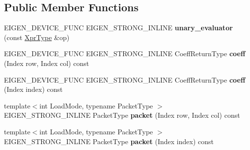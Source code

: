 \subsection*{Public Member Functions}
\begin{DoxyCompactItemize}
\item 
\mbox{\label{struct_eigen_1_1internal_1_1unary__evaluator_3_01_cwise_unary_op_3_01_unary_op_00_01_arg_type_01_4_00_01_index_based_01_4_a742283a9afba17ade87dd3dda0332bab}} 
E\+I\+G\+E\+N\+\_\+\+D\+E\+V\+I\+C\+E\+\_\+\+F\+U\+NC E\+I\+G\+E\+N\+\_\+\+S\+T\+R\+O\+N\+G\+\_\+\+I\+N\+L\+I\+NE {\bfseries unary\+\_\+evaluator} (const \mbox{\hyperlink{class_eigen_1_1_cwise_unary_op}{Xpr\+Type}} \&op)
\item 
\mbox{\label{struct_eigen_1_1internal_1_1unary__evaluator_3_01_cwise_unary_op_3_01_unary_op_00_01_arg_type_01_4_00_01_index_based_01_4_ae84ff73183ad0dcfa3eb3e56b8104948}} 
E\+I\+G\+E\+N\+\_\+\+D\+E\+V\+I\+C\+E\+\_\+\+F\+U\+NC E\+I\+G\+E\+N\+\_\+\+S\+T\+R\+O\+N\+G\+\_\+\+I\+N\+L\+I\+NE Coeff\+Return\+Type {\bfseries coeff} (Index row, Index col) const
\item 
\mbox{\label{struct_eigen_1_1internal_1_1unary__evaluator_3_01_cwise_unary_op_3_01_unary_op_00_01_arg_type_01_4_00_01_index_based_01_4_a2e08c3a5ffe1847d9cde98da1985ce7a}} 
E\+I\+G\+E\+N\+\_\+\+D\+E\+V\+I\+C\+E\+\_\+\+F\+U\+NC E\+I\+G\+E\+N\+\_\+\+S\+T\+R\+O\+N\+G\+\_\+\+I\+N\+L\+I\+NE Coeff\+Return\+Type {\bfseries coeff} (Index index) const
\item 
\mbox{\label{struct_eigen_1_1internal_1_1unary__evaluator_3_01_cwise_unary_op_3_01_unary_op_00_01_arg_type_01_4_00_01_index_based_01_4_a6b1734d8c4ef19363d2de4f034d9dc55}} 
{\footnotesize template$<$int Load\+Mode, typename Packet\+Type $>$ }\\E\+I\+G\+E\+N\+\_\+\+S\+T\+R\+O\+N\+G\+\_\+\+I\+N\+L\+I\+NE Packet\+Type {\bfseries packet} (Index row, Index col) const
\item 
\mbox{\label{struct_eigen_1_1internal_1_1unary__evaluator_3_01_cwise_unary_op_3_01_unary_op_00_01_arg_type_01_4_00_01_index_based_01_4_a89bbe2a517c17d0368317db173fd24bd}} 
{\footnotesize template$<$int Load\+Mode, typename Packet\+Type $>$ }\\E\+I\+G\+E\+N\+\_\+\+S\+T\+R\+O\+N\+G\+\_\+\+I\+N\+L\+I\+NE Packet\+Type {\bfseries packet} (Index index) const
\end{DoxyCompactItemize}
